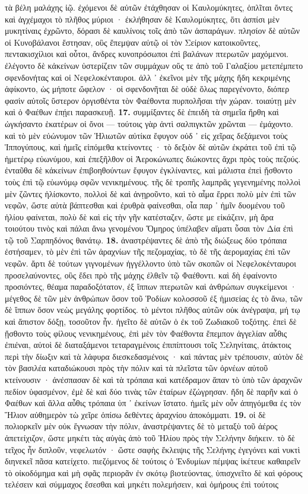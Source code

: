 \documentclass[a4paper, 11pt, oneside, polutonikogreek, german]{article}
\begin{document}
τὰ βέλη μαλάχης ἰῷ. ἐχόμενοι δὲ αὐτῶν ἐτάχθησαν οἱ Καυλομύκητες, ὁπλῖται ὄντες καὶ ἀγχέμαχοι τὸ πλῆθος μύριοι · ἐκλήθησαν δὲ Καυλομύκητες, ὅτι ἀσπίσι μὲν μυκητίναις ἐχρῶντο, δόρασι δὲ καυλίνοις τοῖς ἀπὸ τῶν ἀσπαράγων. πλησίον δὲ αὐτῶν οἱ Κυνοβάλανοι ἔστησαν, οὓς ἔπεμψαν αὐτῷ οἱ τὸν Σείριον κατοικοῦντες, πεντακισχίλιοι καὶ οὗτοι, ἄνδρες κυνοπρόσωποι ἐπὶ βαλάνων πτερωτῶν μαχόμενοι. ἐλέγοντο δὲ κἀκείνων ὑστερίζειν τῶν συμμάχων οὕς τε ἀπὸ τοῦ Γαλαξίου μετεπέμπετο σφενδονήτας καὶ οἱ Νεφελοκένταυροι. ἀλλ ᾽ ἐκεῖνοι μὲν τῆς μάχης ἤδη κεκριμένης ἀφίκοντο, ὡς μήποτε ὤφελον · οἱ σφενδονῆται δὲ οὐδὲ ὅλως παρεγένοντο, διόπερ φασὶν αὐτοῖς ὕστερον ὀργισθέντα τὸν Φαέθοντα πυρπολῆσαι τὴν χώραν. τοιαύτῃ μὲν καὶ ὁ Φαέθων ἐπῄει παρασκευῇ. \textbf{17.} συμμίξαντες δὲ ἐπειδὴ τὰ σημεῖα ἤρθη καὶ ὠγκήσαντο ἑκατέρων οἱ ὄνοι --- τούτοις γὰρ ἀντὶ σαλπιγκτῶν χρῶνται --- ἐμάχοντο. καὶ τὸ μὲν εὐώνυμον τῶν Ἡλιωτῶν αὐτίκα ἔφυγον οὐδ ᾽ εἰς χεῖρας δεξάμενοι τοὺς Ἱππογύπους, καὶ ἡμεῖς εἱπόμεθα κτείνοντες · τὸ δεξιὸν δὲ αὐτῶν ἐκράτει τοῦ ἐπὶ τῷ ἡμετέρῳ εὐωνύμου, καὶ ἐπεξῆλθον οἱ Ἀεροκώνωπες διώκοντες ἄχρι πρὸς τοὺς πεζούς. ἐνταῦθα δὲ κἀκείνων ἐπιβοηθούντων ἔφυγον ἐγκλίναντες, καὶ μάλιστα ἐπεὶ ᾔσθοντο τοὺς ἐπὶ τῷ εὐωνύμῳ σφῶν νενικημένους. τῆς δὲ τροπῆς λαμπρᾶς γεγενημένης πολλοὶ μὲν ζῶντες ἡλίσκοντο, πολλοὶ δὲ καὶ ἀνῃροῦντο, καὶ τὸ αἷμα ἔρρει πολὺ μὲν ἐπὶ τῶν νεφῶν, ὥστε αὐτὰ βάπτεσθαι καὶ ἐρυθρὰ φαίνεσθαι, οἷα παρ ᾽ ἡμῖν δυομένου τοῦ ἡλίου φαίνεται, πολὺ δὲ καὶ εἰς τὴν γῆν κατέσταζεν, ὥστε με εἰκάζειν, μὴ ἄρα τοιούτου τινὸς καὶ πάλαι ἄνω γενομένου Ὅμηρος ὑπέλαβεν αἵματι ὗσαι τὸν Δία ἐπὶ τῷ τοῦ Σαρπηδόνος θανάτῳ. \textbf{18.} ἀναστρέψαντες δὲ ἀπὸ τῆς διώξεως δύο τρόπαια ἐστήσαμεν, τὸ μὲν ἐπὶ τῶν ἀραχνίων τῆς πεζομαχίας, τὸ δὲ τῆς ἀερομαχίας ἐπὶ τῶν νεφῶν. ἄρτι δὲ τούτων γιγνομένων ἠγγέλλοντο ὑπὸ τῶν σκοπῶν οἱ Νεφελοκένταυροι προσελαύνοντες, οὓς ἔδει πρὸ τῆς μάχης ἐλθεῖν τῷ Φαέθοντι. καὶ δὴ ἐφαίνοντο προσιόντες, θέαμα παραδοξότατον, ἐξ ἵππων πτερωτῶν καὶ ἀνθρώπων συγκείμενοι · μέγεθος δὲ τῶν μὲν ἀνθρώπων ὅσον τοῦ Ῥοδίων κολοσσοῦ ἐξ ἡμισείας ἐς τὸ ἄνω, τῶν δὲ ἵππων ὅσον νεὼς μεγάλης φορτίδος. τὸ μέντοι πλῆθος αὐτῶν οὐκ ἀνέγραψα, μή τῳ καὶ ἄπιστον δόξῃ, τοσοῦτον ἦν. ἡγεῖτο δὲ αὐτῶν ὁ ἐκ τοῦ Ζωδιακοῦ τοξότης. ἐπεὶ δὲ ᾔσθοντο τοὺς φίλους νενικημένους, ἐπὶ μὲν τὸν Φαέθοντα ἔπεμπον ἀγγελίαν αὖθις ἐπιέναι, αὐτοὶ δὲ διαταξάμενοι τεταραγμένοις ἐπιπίπτουσι τοῖς Σεληνίταις, ἀτάκτοις περὶ τὴν δίωξιν καὶ τὰ λάφυρα διεσκεδασμένοις · καὶ πάντας μὲν τρέπουσιν, αὐτὸν δὲ τὸν βασιλέα καταδιώκουσι πρὸς τὴν πόλιν καὶ τὰ πλεῖστα τῶν ὀρνέων αὐτοῦ κτείνουσιν · ἀνέσπασαν δὲ καὶ τὰ τρόπαια καὶ κατέδραμον ἅπαν τὸ ὑπὸ τῶν ἀραχνῶν πεδίον ὑφασμένον, ἐμὲ δὲ καὶ δύο τινὰς τῶν ἑταίρων ἐζώγρησαν. ἤδη δὲ παρῆν καὶ ὁ Φαέθων καὶ ἄλλα αὖθις τρόπαια ὑπ ᾽ ἐκείνων ἵστατο. ἡμεῖς μὲν οὖν ἀπηγόμεθα ἐς τὸν Ἥλιον αὐθημερὸν τὼ χεῖρε ὀπίσω δεθέντες ἀραχνίου ἀποκόμματι. \textbf{19.} οἱ δὲ πολιορκεῖν μὲν οὐκ ἔγνωσαν τὴν πόλιν, ἀναστρέψαντες δὲ τὸ μεταξὺ τοῦ ἀέρος ἀπετείχιζον, ὥστε μηκέτι τὰς αὐγὰς ἀπὸ τοῦ Ἡλίου πρὸς τὴν Σελήνην διήκειν. τὸ δὲ τεῖχος ἦν διπλοῦν, νεφελωτόν · ὥστε σαφὴς ἔκλειψις τῆς Σελήνης ἐγεγόνει καὶ νυκτὶ διηνεκεῖ πᾶσα κατείχετο. πιεζόμενος δὲ τούτοις ὁ Ἐνδυμίων πέμψας ἱκέτευε καθαιρεῖν τὸ οἰκοδόμημα καὶ μὴ σφᾶς περιορᾶν ἐν σκότῳ βιοτεύοντας, ὑπισχνεῖτο δὲ καὶ φόρους τελέσειν καὶ σύμμαχος ἔσεσθαι καὶ μηκέτι πολεμήσειν, καὶ ὁμήρους ἐπὶ τούτοις 
\end{document}
